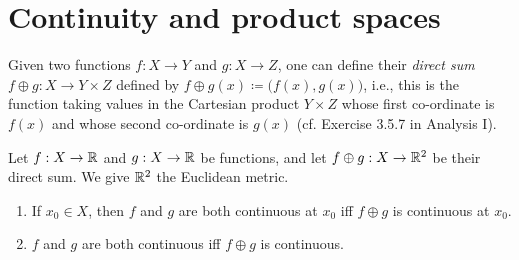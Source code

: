 \section{Continuity and product spaces}\label{sec:2.2}

\begin{note}
  Given two functions \(f : X \to Y\) and \(g : X \to Z\), one can define their \emph{direct sum} \(f \oplus g : X \to Y \times Z\) defined by \(f \oplus g(x) \coloneqq \big(f(x), g(x)\big)\), i.e., this is the function taking values in the Cartesian product \(Y \times Z\) whose first co-ordinate is \(f(x)\) and whose second co-ordinate is \(g(x)\)
  (cf. Exercise 3.5.7 in Analysis I).
\end{note}

\begin{lem}\label{2.2.1}
  Let \(f : X \to \mathbb{R}\) and \(g : X \to \mathbb{R}\) be functions, and let \(f \oplus g : X \to \mathbb{R}^2\) be their direct sum.
  We give \(\mathbb{R}^2\) the Euclidean metric.
  \begin{enumerate}
    \item If \(x_0 \in X\), then \(f\) and \(g\) are both continuous at \(x_0\) iff \(f \oplus g\) is continuous at \(x_0\).
    \item \(f\) and \(g\) are both continuous iff \(f \oplus g\) is continuous.
  \end{enumerate}
\end{lem}

